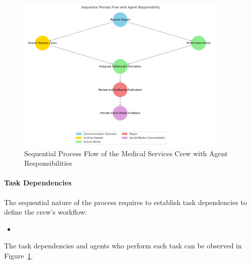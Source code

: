 \begin{figure}[h!]
	\centering
	\includegraphics[width=0.9\textwidth]{figures/PC-process.png}
	\caption{Sequential Process Flow of the Medical Services Crew with Agent Responsibilities}
	\label{fig:medical_services_flow}
\end{figure}


\paragraph{Task Dependencies}
The sequential nature of the process requires to establish task dependencies to define the crew's workflow:
\begin{itemize}
	\item 
\end{itemize}

The task dependencies and agents who perform each task can be observed in Figure~\ref{fig:medical_services_flow}.
